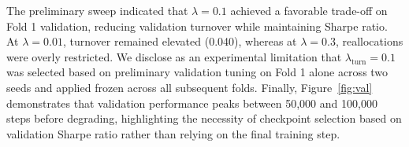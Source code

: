 \documentclass[11pt,a4paper]{article}
\numberwithin{equation}{section}
\numberwithin{table}{section}
\numberwithin{figure}{section}
\numberwithin{algorithm}{section}
\begin{document}
The preliminary sweep indicated that $\lambda=0.1$ achieved a favorable trade-off on Fold 1 validation, reducing validation turnover while maintaining Sharpe ratio. At $\lambda=0.01$, turnover remained elevated (0.040), whereas at $\lambda=0.3$, reallocations were overly restricted. We disclose as an experimental limitation that $\lambda_{\mathrm{turn}}=0.1$ was selected based on preliminary validation tuning on Fold 1 alone across two seeds and applied frozen across all subsequent folds. Finally, Figure~\ref{fig:val} demonstrates that validation performance peaks between 50,000 and 100,000 steps before degrading, highlighting the necessity of checkpoint selection based on validation Sharpe ratio rather than relying on the final training step.

\end{document}
